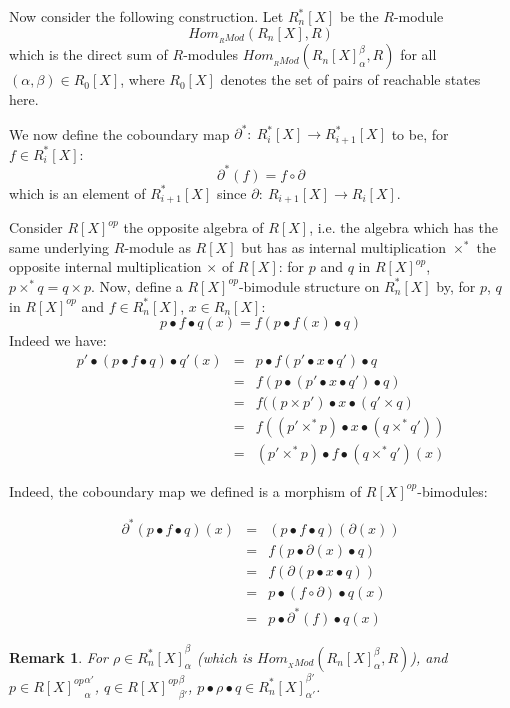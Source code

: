 \documentclass{article}
\newtheorem{remark}[definition]{Remark} %
\begin{document}
Now consider the following construction. Let $R^*_n[X]$ be the $R$-module $$Hom_{{ }_R Mod}(R_n[X],R)$$ 
\noindent which is the direct sum of $R$-modules $Hom_{{ }_R Mod}(R_n[X]^\beta_\alpha,R)$ for all $(\alpha,\beta)\in R_0[X]$, where $R_0[X]$ denotes the set of pairs of reachable states here.

We now define the coboundary map $\partial^*: \ R_i^*[X] \rightarrow R_{i+1}^*[X]$ to be, for $f \in R_i^*[X]$:
$$
\partial^*(f) = f \circ \partial
$$
\noindent which is an element of $R_{i+1}^*[X]$ since $\partial: \ R_{i+1}[X] \rightarrow R_i[X]$.

Consider $R[X]^{op}$ the opposite algebra of $R[X]$, i.e. the algebra which has the same underlying $R$-module as $R[X]$ but has as internal multiplication $\times^*$ the opposite internal multiplication $\times$ of $R[X]$: for $p$ and $q$ in $R[X]^{op}$, $p\times^* q=q\times p$. Now, define a $R[X]^{op}$-bimodule structure on $R_n^*[X]$ by, for $p$, $q$ in $R[X]^{op}$ and $f \in R_n^*[X]$, $x \in R_n[X]$: 
$$
p\bullet f \bullet q (x)=f(p\bullet f(x) \bullet q) 
$$
Indeed we have: 
$$\begin{array}{rcl}
p'\bullet (p\bullet f \bullet q)\bullet q'(x) & = & p\bullet f(p'\bullet x \bullet q') \bullet q\\
& = & f(p\bullet (p'\bullet x \bullet q')\bullet q) \\
& = & f((p\times p')\bullet x \bullet (q'\times q) \\
& = & f((p'\times^* p)\bullet x \bullet (q\times^* q')) \\
& = & (p'\times^* p) \bullet f \bullet (q\times^* q') (x)
\end{array}
$$


Indeed, the coboundary map we defined is a morphism of $R[X]^{op}$-bimodules: 

$$
\begin{array}{rcl}
\partial^*(p\bullet f \bullet q)(x) & = & (p\bullet f \bullet q)(\partial(x)) \\
& = & f(p\bullet \partial(x) \bullet q) \\
& = & f(\partial(p\bullet x \bullet q)) \\
& = & p\bullet (f \circ \partial) \bullet q(x) \\
& = & p \bullet \partial^*(f) \bullet q (x)
\end{array}
$$

\begin{remark}
For $\rho \in {R^*_n[X]}_\alpha^\beta$ (which is $Hom_{{ }_X Mod}({R_n[X]}_\alpha^\beta,R)$), and $p \in {R[X]^{op}}_\alpha^{\alpha'}$, $q \in {R[X]^{op}}_{\beta'}^\beta$, $p\bullet \rho \bullet q \in {R^*_n[X]}_{\alpha'}^{\beta'}$.
\end{remark}
\end{document}
